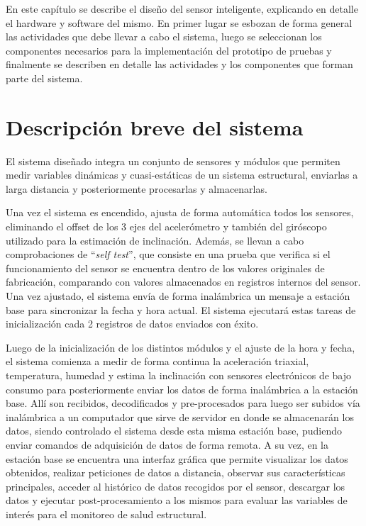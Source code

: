 En este capítulo se describe el diseño del sensor inteligente, explicando en detalle el hardware y software del mismo. En primer lugar se esbozan de forma general las actividades que debe llevar a cabo el sistema, luego se seleccionan los componentes necesarios para la implementación del prototipo de pruebas y finalmente se describen en detalle las actividades y los componentes que forman parte del sistema.

\section{Descripción breve del sistema}
\label{subsec:descpsist}

El sistema diseñado integra un conjunto de sensores y módulos que permiten medir variables dinámicas y cuasi-estáticas de un sistema estructural, enviarlas a larga distancia y posteriormente procesarlas y almacenarlas.

Una vez el sistema es encendido, ajusta de forma automática todos los sensores, eliminando el offset de los 3 ejes del acelerómetro y también del giróscopo utilizado para la estimación de inclinación. Además, se llevan a cabo comprobaciones de ``\textit{self test}'', que consiste en una prueba que verifica si el funcionamiento del sensor se encuentra dentro de los valores originales de fabricación, comparando con valores almacenados en registros internos del sensor. Una vez ajustado, el sistema envía de forma inalámbrica un mensaje a estación base para sincronizar la fecha y hora actual. El sistema ejecutará estas tareas de inicialización cada 2 registros de datos enviados con éxito.

Luego de la inicialización de los distintos módulos y el ajuste de la hora y fecha, el sistema comienza a medir de forma continua la aceleración triaxial, temperatura, humedad y estima la inclinación con sensores electrónicos de bajo consumo para posteriormente enviar los datos de forma inalámbrica a la estación base. Allí son recibidos, decodificados y pre-procesados para luego ser subidos vía inalámbrica a un computador que sirve de servidor en donde se almacenarán los datos, siendo controlado el sistema desde esta misma estación base, pudiendo enviar comandos de adquisición de datos de forma remota. A su vez, en la estación base se encuentra una interfaz gráfica que permite visualizar los datos obtenidos, realizar peticiones de datos a distancia, observar sus características principales, acceder al histórico de datos recogidos por el sensor, descargar los datos y ejecutar post-procesamiento a los mismos para evaluar las variables de interés para el monitoreo de salud estructural.

